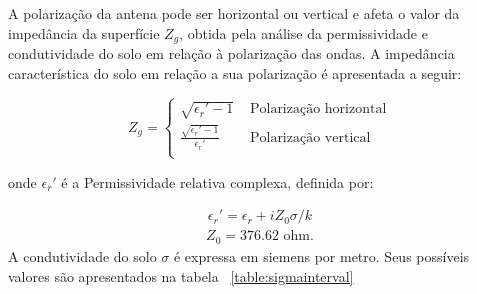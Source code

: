 A polarização da antena pode ser horizontal ou vertical e afeta o valor da impedância da superfície \begin{math}Z_g\end{math}, obtida pela análise da permissividade e condutividade do solo em relação à polarização das ondas. A impedância característica do solo em relação a sua polarização é apresentada a seguir:

\[
	      Z_g = \begin{cases} 
	 \sqrt{\epsilon_r' - 1} & \textrm{ Polarização horizontal} \\
       \frac{\sqrt{\epsilon_r' - 1}}{\epsilon_r'} & \textrm{ Polarização vertical} \\
   	\end{cases}
\]

onde \begin{math}\epsilon_r'\end{math} é a Permissividade relativa complexa, definida por:

\begin{align}
\label{eps_r} \epsilon_r' = \epsilon_r + i Z_0\sigma/k
\end{align}
\begin{align}
\label{z_0} Z_0 = 376.62 \textrm{ ohm.}
\end{align}
A condutividade do solo $\sigma$ é expressa em siemens por metro. Seus possíveis valores são apresentados na tabela ~\ref{table:sigmainterval}

\begin{table}[h]
\caption[Valores para a permissividade relativa e condutividade do solo.]
{Valores para a permissividade relativa e condutividade do solo.}
\label{table:sigmainterval}
\centering
{}
\end{table}

